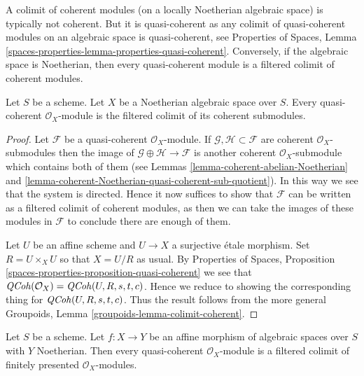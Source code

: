 \noindent
A colimit of coherent modules (on a locally Noetherian
algebraic space) is typically not coherent. But it is quasi-coherent
as any colimit of quasi-coherent modules on an algebraic space is
quasi-coherent, see Properties of Spaces, Lemma
\ref{spaces-properties-lemma-properties-quasi-coherent}.
Conversely, if the algebraic space is Noetherian, then every quasi-coherent
module is a filtered colimit of coherent modules.

\begin{lemma}
\label{lemma-directed-colimit-coherent}
Let $S$ be a scheme. Let $X$ be a Noetherian algebraic space over $S$.
Every quasi-coherent $\mathcal{O}_X$-module is the filtered colimit
of its coherent submodules.
\end{lemma}

\begin{proof}
Let $\mathcal{F}$ be a quasi-coherent $\mathcal{O}_X$-module.
If $\mathcal{G}, \mathcal{H} \subset \mathcal{F}$ are coherent
$\mathcal{O}_X$-submodules then the image of
$\mathcal{G} \oplus \mathcal{H} \to \mathcal{F}$ is another
coherent $\mathcal{O}_X$-submodule which contains both of them
(see Lemmas \ref{lemma-coherent-abelian-Noetherian} and
\ref{lemma-coherent-Noetherian-quasi-coherent-sub-quotient}).
In this way we see that the system is directed.
Hence it now suffices to show that $\mathcal{F}$ can be written as
a filtered colimit of coherent modules, as then we can take the
images of these modules in $\mathcal{F}$ to conclude there are
enough of them.

\medskip\noindent
Let $U$ be an affine scheme and $U \to X$ a surjective \'etale morphism.
Set $R = U \times_X U$ so that $X = U/R$ as usual. By
Properties of Spaces, Proposition
\ref{spaces-properties-proposition-quasi-coherent}
we see that $\mathit{QCoh}(\mathcal{O}_X) = \mathit{QCoh}(U, R, s, t, c)$.
Hence we reduce to showing the corresponding thing for
$\mathit{QCoh}(U, R, s, t, c)$. Thus the result follows from
the more general Groupoids, Lemma \ref{groupoids-lemma-colimit-coherent}.
\end{proof}

\begin{lemma}
\label{lemma-direct-colimit-finite-presentation}
Let $S$ be a scheme. Let $f : X \to Y$ be an affine morphism of algebraic
spaces over $S$ with $Y$ Noetherian. Then every quasi-coherent
$\mathcal{O}_X$-module is a filtered colimit of finitely presented
$\mathcal{O}_X$-modules.
\end{lemma}

